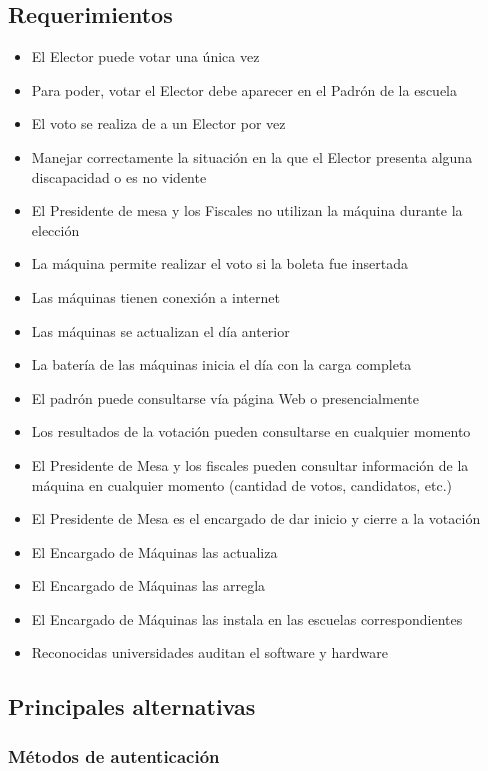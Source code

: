 \documentclass[spanish, 10pt,a4paper]{article}
\numberwithin{equation}{section} %
\begin{document}
\subsection{Requerimientos}
\begin{itemize}
\item El Elector puede votar una única vez
\item Para poder, votar el Elector debe aparecer en el Padrón de la escuela
\item El voto se realiza de a un Elector por vez
\item Manejar correctamente la situación en la que el Elector presenta alguna discapacidad o es no vidente
\item El Presidente de mesa y los Fiscales no utilizan la máquina durante la elección
\item La máquina permite realizar el voto si la boleta fue insertada
\item Las máquinas tienen conexión a internet
\item Las máquinas se actualizan el día anterior
\item La batería de las máquinas inicia el día con la carga completa
\item El padrón puede consultarse vía página Web o presencialmente
\item Los resultados de la votación pueden consultarse en cualquier momento
\item El Presidente de Mesa y los fiscales pueden consultar información de la máquina en cualquier momento (cantidad de votos, candidatos, etc.)
\item El Presidente de Mesa es el encargado de dar inicio y cierre a la votación
\item El Encargado de Máquinas las actualiza
\item El Encargado de Máquinas las arregla
\item El Encargado de Máquinas las instala en las escuelas correspondientes
\item Reconocidas universidades auditan el software y hardware	
\end{itemize}

\subsection{Principales alternativas}
\subsubsection{Métodos de autenticación}
\end{document}
